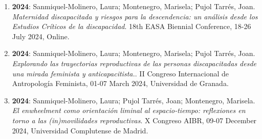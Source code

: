 \begin{enumerate}
\item {\bf 2024}: Sanmiquel-Molinero, Laura; Montenegro, Marisela; Pujol Tarrés, Joan. {\it Maternidad discapacitada y riesgos para la descendencia: un análisis desde los Estudios Críticos de la discapacidad}. 18th EASA Biennial Conference, 18-26 July 2024, Online.\filbreak
\item {\bf 2024}: Sanmiquel-Molinero, Laura; Montenegro, Marisela; Pujol Tarrés, Joan. {\it Explorando las trayectorias reproductivas de las personas discapacitadas desde una mirada feminista y anticapacitista.}. II Congreso Internacional de Antropología Feminista, 01-07 March 2024, Universidad de Granada.\filbreak
\item {\bf 2024}: Sanmiquel-Molinero, Laura; Pujol Tarrés, Joan; Montenegro, Marisela. {\it El enwheelment como orientación liminal al espacio-tiempo: reflexiones en torno a las (in)movilidades reproductivas}. X Congreso AIBR, 09-07 December 2024, Universidad Complutense de Madrid.\filbreak
\end{enumerate} 
